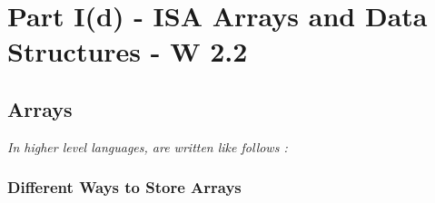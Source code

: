 \chapter{Part I(d) - ISA Arrays and Data Structures - W 2.2}
\section{Arrays}
\textit{In higher level languages, are written like follows :}
\begin{cc}
    
\end{cc}
\subsection{Different Ways to Store Arrays}

